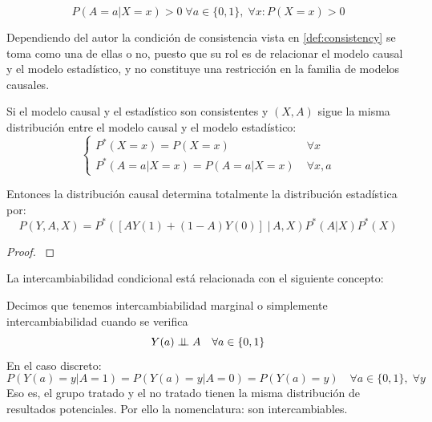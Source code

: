 \begin{definicion}[Positividad] \label{def:positivity}
    \[ P(A = a | X = x) > 0 \; \forall a \in \{0, 1\}, \; \forall x:  P(X = x) > 0\]
\end{definicion}

Dependiendo del autor la condición de consistencia vista en \ref{def:consistency}
se toma como una de ellas o no, puesto que su rol es de relacionar el modelo causal
y el modelo estadístico, y no constituye una restricción en la familia de modelos causales.

\begin{proposicion}
    Si el modelo causal y el estadístico son consistentes
    y $(X, A)$ sigue la misma distribución entre el modelo causal y el modelo estadístico:
    \[
        \begin{cases}
            P^*(X = x) = P(X = x) \;                 & \forall x    \\
            P^*(A = a | X = x) = P(A = a | X = x) \; & \forall x, a
        \end{cases}
    \]

    Entonces la distribución causal determina totalmente la distribución estadística por:
    \[ P(Y, A, X) = P^*([AY(1) + (1 - A)Y(0)] \; |\, A, X) P^*(A | X) P^*(X) \]
\end{proposicion}

\begin{proof} \cite[sección 2.1]{mci}
\end{proof}

La intercambiabilidad condicional está relacionada con el siguiente concepto:

\begin{definicion} \label{def:intercambiabilidad-marginal}
    Decimos que tenemos intercambiabilidad marginal o simplemente intercambiabilidad cuando
    se verifica
    \[ Y(a) \mathrel{\perp\!\!\!\perp} A \quad \forall a \in \{0, 1\} \] %
    En el caso discreto:
    \[
        P(Y(a) = y | A = 1) = P(Y(a) = y | A = 0) = P(Y(a) = y) \quad \forall a \in \{0, 1\}, \; \forall y
    \]
    Eso es, el grupo tratado y el no tratado tienen la misma distribución de resultados potenciales.
    Por ello la nomenclatura: son intercambiables.
\end{definicion}

